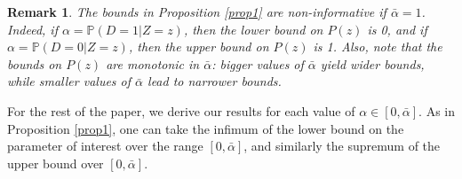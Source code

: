 \documentclass[11pt,reqno]{amsart}
\theoremstyle{plain}
\newtheorem{remark}{Remark}
\numberwithin{equation}{section}
\begin{document}
\begin{remark}
The bounds in Proposition \ref{prop1} are non-informative if $\bar{\alpha}=1$. Indeed, if $\alpha=\mathbb P(D=1\vert Z=z)$, then the lower bound on $P(z)$ is 0, and if $\alpha=\mathbb P(D=0\vert Z=z)$, then the upper bound on $P(z)$ is 1. Also, note that the bounds on $P(z)$ are monotonic in $\bar{\alpha}$: bigger values of $\bar{\alpha}$ yield wider bounds, while smaller values of $\bar{\alpha}$ lead to narrower bounds.
\end{remark}

For the rest of the paper, we derive our results for each value of $\alpha \in [0,\bar{\alpha}]$. As in Proposition \ref{prop1}, one can take the infimum of the lower bound on the parameter of interest over the range $[0,\bar{\alpha}]$, and similarly the supremum of the upper bound over $[0,\bar{\alpha}]$.  
\end{document}
